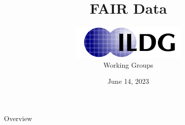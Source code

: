 \documentclass[aspectratio=169,xcolor=dvipsnames]{beamer}
\title[short title]{FAIR Data}
\author{\includegraphics[scale=0.5]{ildg-logo}\\Working Groups}
\institute{Hands-on Workshop}
\date{June 14, 2023 } %
\begin{document}
\begin{frame}
    \titlepage

\end{frame}

\begin{frame}{Overview}
    \tableofcontents
\end{frame}

\end{document}

